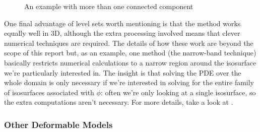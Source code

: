 \begin{figure}[H]
\begin{center}
	\hspace{4mm}%
\end{center}
\caption{An example with more than one connected component}
\label{fig:levelsets-discrete2}
\end{figure}

One final advantage of level sets worth mentioning is that the method works equally well in 3D, although the extra processing involved means that clever numerical techniques are required. The details of how these work are beyond the scope of this report but, as an example, one method (the narrow-band technique) basically restricts numerical calculations to a narrow region around the isosurface we're particularly interested in. The insight is that solving the PDE over the whole domain is only necessary if we're interested in solving for the entire family of isosurfaces associated with $\phi$: often we're only looking at a single isosurface, so the extra computations aren't necessary. For more details, take a look at \cite{yoo04}.

\subsubsection{Other Deformable Models}

